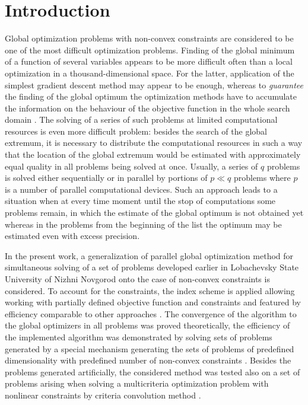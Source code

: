 \documentclass[runningheads]{llncs}
\begin{document}
\section{Introduction}
\label{sec-intro}
Global optimization problems with non-convex constraints are considered to be one
of the most difficult optimization problems.
Finding of the global minimum of a function of several variables appears to be more
difficult often than a local optimization in a thousand-dimensional space.
For the latter, application of the simplest gradient descent method may appear to be enough,
whereas to \textit{guarantee} the finding of the global optimum the optimization
methods have to accumulate the information on the behaviour of the objective function in the
whole search domain \cite{Jones2009,Paulavicius2011,Evtushenko2013,Strongin2000}.
The solving of a series of such problems at limited computational resources is even more
difficult problem: besides the search of the global extremum, it is necessary to distribute the
computational resources in such a way that the location of the global extremum would be
estimated with approximately equal quality in all problems being solved at once.
Usually, a series of \(q\) problems is solved either sequentially or in parallel by portions of \(p\ll
q\) problems where \(p\) is a number of parallel computational devices.
Such an approach leads to a situation when at every time moment until the stop of computations
some problems remain, in which the estimate of the global optimum is not obtained yet whereas
in the problems from the beginning of the list the optimum may be estimated even with excess
precision.

In the present work, a generalization of parallel global optimization method for simultaneous
solving of a set of problems developed earlier in Lobachevsky State University of Nizhni Novgorod
\cite{BarkalovStrongin2018} onto the case of non-convex constraints is considered. To account
for the constraints, the index scheme \cite{Strongin2000,Pugliese} is applied allowing working with
partially defined objective function and constraints and featured by efficiency comparable to other
approaches \cite{BarkalovLebedev2017}. The convergence of the algorithm to the global
optimizers in all problems was proved theoretically, the efficiency of the implemented
algorithm was demonstrated by solving sets of problems generated by a special mechanism
generating the sets of problems of predefined dimensionality with predefined number of
non-convex constraints \cite{GergelBarkalov2019}.
Besides the problems generated artificially, the considered method was tested also on a set of
problems arising when solving a multicriteria optimization problem with nonlinear constraints by
criteria convolution method \cite{Ehrgott2005}.
\end{document}
